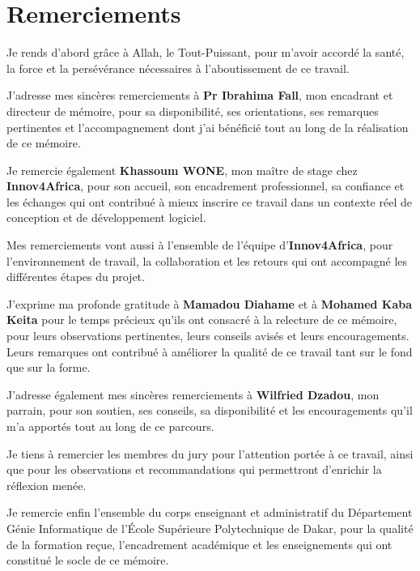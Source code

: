 
\chapter*{Remerciements}
{}

Je rends d'abord grâce à Allah, le Tout-Puissant, pour m'avoir accordé la santé, la force et la persévérance nécessaires à l'aboutissement de ce travail.

J'adresse mes sincères remerciements à \textbf{Pr Ibrahima Fall}, mon encadrant et directeur de mémoire, pour sa disponibilité, ses orientations, ses remarques pertinentes et l'accompagnement dont j'ai bénéficié tout au long de la réalisation de ce mémoire.

Je remercie également \textbf{Khassoum WONE}, mon maître de stage chez \textbf{Innov4Africa}, pour son accueil, son encadrement professionnel, sa confiance et les échanges qui ont contribué à mieux inscrire ce travail dans un contexte réel de conception et de développement logiciel.

Mes remerciements vont aussi à l'ensemble de l'équipe d'\textbf{Innov4Africa}, pour l'environnement de travail, la collaboration et les retours qui ont accompagné les différentes étapes du projet.

J'exprime ma profonde gratitude à \textbf{Mamadou Diahame} et à \textbf{Mohamed Kaba Keita} pour le temps précieux qu'ils ont consacré à la relecture de ce mémoire, pour leurs observations pertinentes, leurs conseils avisés et leurs encouragements. Leurs remarques ont contribué à améliorer la qualité de ce travail tant sur le fond que sur la forme.

J'adresse également mes sincères remerciements à \textbf{Wilfried Dzadou}, mon parrain, pour son soutien, ses conseils, sa disponibilité et les encouragements qu'il m'a apportés tout au long de ce parcours.

Je tiens à remercier les membres du jury pour l'attention portée à ce travail, ainsi que pour les observations et recommandations qui permettront d'enrichir la réflexion menée.

Je remercie enfin l'ensemble du corps enseignant et administratif du Département Génie Informatique de l'École Supérieure Polytechnique de Dakar, pour la qualité de la formation reçue, l'encadrement académique et les enseignements qui ont constitué le socle de ce mémoire.

\cleardoublepage

